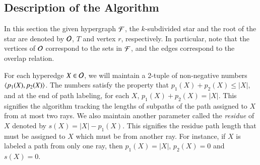 \documentclass[MS,]{iitmdiss}
\begin{document}
\subsection{Description of the Algorithm}
In this section the given hypergraph ${\cal F}$, the $k$-subdivided star
and the root of the star are denoted by ${\cal O}$, $T$ and vertex $r$,
respectively.  In particular, note that the vertices of ${\cal O}$
correspond to the sets in ${\cal F}$, and the edges correspond to the
overlap relation.

For each hyperedge $X \in {\cal O}$, we will maintain a 2-tuple of non-negative
 numbers $\left\langle p_1(X), p_2(X) \right\rangle$.  The numbers satisfy the property that
 $p_1(X) + p_2(X) \leq |X|$, and at the end of path labeling, for each
 $X$, $p_1(X) + p_2(X) = |X|$.  This signifies the algorithm tracking
 the lengths of subpaths of the path assigned to $X$ from at most two
 rays. We also maintain another parameter called the {\em residue} of
 $X$ denoted by $s(X)=|X| - p_1(X)$. This signifies the residue path
 length that must be assigned to $X$ which must be from another
 ray. For instance, if $X$ is labeled a path from only one ray, then
 $p_1(X) = |X|$, $p_2(X) = 0$ and $s(X) = 0$.
\end{document}
